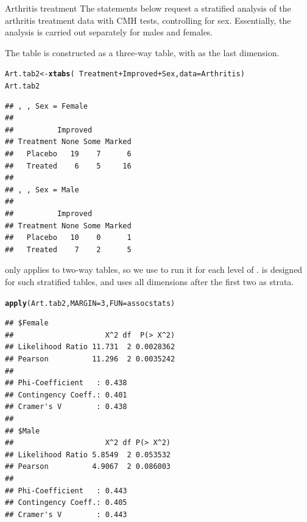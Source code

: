 \documentclass[11pt]{book}\usepackage[]{graphicx}\usepackage[]{color}
\makeatletter
\newcommand{\hlnum}[1]{\textcolor[rgb]{0.686,0.059,0.569}{#1}}%
\newcommand{\hlopt}[1]{\textcolor[rgb]{0,0,0}{#1}}%
\newcommand{\hlstd}[1]{\textcolor[rgb]{0.345,0.345,0.345}{#1}}%
\newcommand{\hlkwb}[1]{\textcolor[rgb]{0.69,0.353,0.396}{#1}}%
\newcommand{\hlkwc}[1]{\textcolor[rgb]{0.333,0.667,0.333}{#1}}%
\newcommand{\hlkwd}[1]{\textcolor[rgb]{0.737,0.353,0.396}{\textbf{#1}}}%
\newenvironment{kframe}{%
 \def\at@end@of@kframe{}%
 \ifinner\ifhmode%
  \def\at@end@of@kframe{\end{minipage}}%
  \begin{minipage}{\columnwidth}%
 \fi\fi%
 \def\FrameCommand##1{\hskip\@totalleftmargin \hskip-\fboxsep
 \colorbox{shadecolor}{##1}\hskip-\fboxsep
     \hskip-\linewidth \hskip-\@totalleftmargin \hskip\columnwidth}%
 \MakeFramed {\advance\hsize-\width
   \@totalleftmargin\z@ \linewidth\hsize
   \@setminipage}}%
 {\par\unskip\endMakeFramed%
 \at@end@of@kframe}
\newenvironment{knitrout}{}{} %
\renewenvironment{knitrout}{\small\renewcommand{\baselinestretch}{.85}}{} %
\makeatother
\begin{document}
\begin{Example}[arthrit3]{Arthritis treatment}
The statements below request a stratified analysis of the arthritis
treatment data
with CMH tests,
controlling for sex.  Essentially, the analysis is carried out
separately for males and females.

The table  is constructed as a three-way table,
with  as the last dimension.
\begin{knitrout}
\color{fgcolor}\begin{kframe}
\begin{alltt}
\hlstd{Art.tab2} \hlkwb{<-} \hlkwd{xtabs}\hlstd{(}\hlopt{~}\hlstd{Treatment} \hlopt{+} \hlstd{Improved} \hlopt{+} \hlstd{Sex,} \hlkwc{data}\hlstd{=Arthritis)}
\hlstd{Art.tab2}
\end{alltt}
\begin{verbatim}
## , , Sex = Female
## 
##          Improved
## Treatment None Some Marked
##   Placebo   19    7      6
##   Treated    6    5     16
## 
## , , Sex = Male
## 
##          Improved
## Treatment None Some Marked
##   Placebo   10    0      1
##   Treated    7    2      5
\end{verbatim}
\end{kframe}
\end{knitrout}

 only applies to two-way tables, so we use
 to run it for each level of .  
 is designed for such stratified tables, and
uses all dimensions after the first two as strata.
\begin{knitrout}
\color{fgcolor}\begin{kframe}
\begin{alltt}
\hlkwd{apply}\hlstd{(Art.tab2,} \hlkwc{MARGIN}\hlstd{=}\hlnum{3}\hlstd{,} \hlkwc{FUN}\hlstd{=assocstats)}
\end{alltt}
\begin{verbatim}
## $Female
##                     X^2 df  P(> X^2)
## Likelihood Ratio 11.731  2 0.0028362
## Pearson          11.296  2 0.0035242
## 
## Phi-Coefficient   : 0.438 
## Contingency Coeff.: 0.401 
## Cramer's V        : 0.438 
## 
## $Male
##                     X^2 df P(> X^2)
## Likelihood Ratio 5.8549  2 0.053532
## Pearson          4.9067  2 0.086003
## 
## Phi-Coefficient   : 0.443 
## Contingency Coeff.: 0.405 
## Cramer's V        : 0.443
\end{verbatim}
\end{kframe}
\end{knitrout}


\end{Example}
\end{document}
